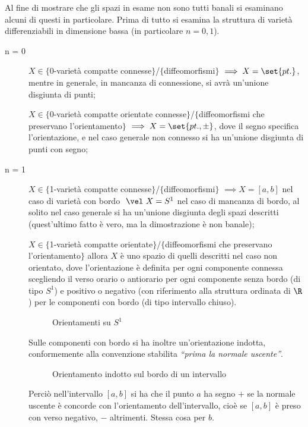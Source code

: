 
Al fine di mostrare che gli spazi in esame non sono tutti banali si esaminano alcuni di questi in particolare.
Prima di tutto si esamina la struttura di varietà differenziabili in dimensione bassa (in particolare $n = 0, 1$).
\begin{description}
\item [n = 0] $X \in \{$0-varietà compatte connesse$\}$/$\{$diffeomorfismi$\}$ $\implies X = \set{pt.}$, mentre in generale, in mancanza di connessione, si avrà un'unione disgiunta di punti;

$X \in \{$0-varietà compatte orientate connesse$\}$/$\{$diffeomorfismi che preservano l'orientamento$\}$ $\implies X = \set{pt., \pm}$, dove il segno specifica l'orientazione, e nel caso generale non connesso si ha un'unione disgiunta di punti con segno;
\item [n = 1] $X \in \{$1-varietà compatte connesse$\}$/$\{$diffeomorfismi$\}$ $\implies X = [a,b]$ nel caso di varietà con bordo $~\vel~ X = S^1$ nel caso di mancanza di bordo, al solito nel caso generale si ha un'unione disgiunta degli spazi descritti (quest'ultimo fatto è vero, ma la dimostrazione è non banale);

$X \in \{$1-varietà compatte orientate$\}$/$\{$diffeomorfismi che preservano l'orientamento$\}$ allora $X$ è uno spazio di quelli descritti nel caso non orientato, dove l'orientazione è definita per ogni componente connessa scegliendo il verso orario o antiorario per ogni componente senza bordo (di tipo $S^1$) e positivo o negativo (con riferimento alla struttura ordinata di $\R$) per le componenti con bordo (di tipo intervallo chiuso).

\begin{figure}[h]
\centering

\caption{Orientamenti su $S^1$}
\end{figure}
Sulle componenti con bordo si ha inoltre un'orientazione indotta, conformemente alla convenzione stabilita \emph{``prima la normale uscente''}.
\begin{figure}[h]
\centering

\caption{Orientamento indotto sul bordo di un intervallo}
\end{figure}
Perciò nell'intervallo $[a,b]$ si ha che il punto $a$ ha segno $+$ se la normale uscente è concorde con l'orientamento dell'intervallo, cioè se $[a,b]$ è preso con verso negativo, $-$ altrimenti. Stessa cosa per $b$.
\end{description}

